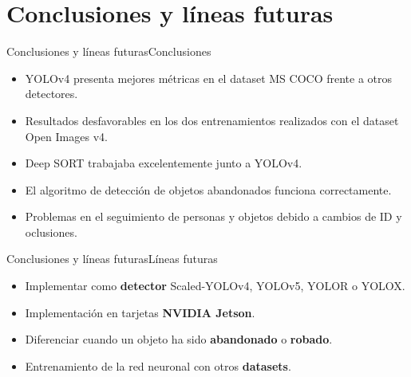\section{Conclusiones y líneas futuras}
\begin{frame}{Conclusiones y líneas futuras}{Conclusiones}

\begin{itemize}
  \setlength\itemsep{1.5em}
  \justifying
  \item YOLOv4 presenta mejores métricas en el dataset MS COCO frente a otros detectores. 
  \item Resultados desfavorables en los dos entrenamientos realizados con el dataset Open Images v4.
  \item Deep SORT trabajaba excelentemente junto a YOLOv4.
  \item El algoritmo de detección de objetos abandonados funciona correctamente.
  \item Problemas en el seguimiento de personas y objetos debido a cambios de ID y oclusiones.
\end{itemize}

\end{frame}


\begin{frame}{Conclusiones y líneas futuras}{Líneas futuras}

\begin{itemize}
  \setlength\itemsep{2em}
  \justifying
  \item Implementar como \textbf{detector} Scaled-YOLOv4, YOLOv5, YOLOR o YOLOX. 
  \item Implementación en tarjetas \textbf{NVIDIA Jetson}.
  \item Diferenciar cuando un objeto ha sido \textbf{abandonado} o \textbf{robado}.
  \item Entrenamiento de la red neuronal con otros \textbf{datasets}.
\end{itemize}

\end{frame}